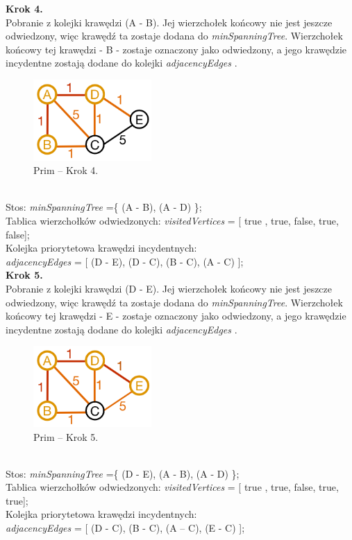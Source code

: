 \textbf{Krok 4.}\\
Pobranie z kolejki krawędzi (A - B). Jej wierzchołek końcowy nie jest jeszcze odwiedzony, więc krawędź ta zostaje dodana do \emph{minSpanningTree}. Wierzchołek końcowy tej krawędzi - B - zostaje oznaczony jako odwiedzony, a jego krawędzie incydentne zostają dodane do kolejki \emph{adjacencyEdges} .
\begin{figure}[htb!]
	\centering
	\includegraphics[width=0.4\textwidth]{tex/fig/graf4}
	\caption{Prim -- Krok 4.}
	\label{fig: g4}
\end{figure}\\
Stos: \emph{minSpanningTree} =\{ (A - B), (A - D) \};\\
Tablica wierzchołków odwiedzonych: \emph{visitedVertices} = [ true , true, false, true, false];\\
Kolejka priorytetowa krawędzi incydentnych: \\ \emph{adjacencyEdges} = [ (D - E), (D - C), (B - C), (A - C) ];\\

\textbf{Krok 5.}\\
Pobranie z kolejki krawędzi (D - E). Jej wierzchołek końcowy nie jest jeszcze odwiedzony, więc krawędź ta zostaje dodana do \emph{minSpanningTree}. Wierzchołek końcowy tej krawędzi - E - zostaje oznaczony jako odwiedzony, a jego krawędzie incydentne zostają dodane do kolejki \emph{adjacencyEdges} .
\begin{figure}[htb!]
	\centering
	\includegraphics[width=0.4\textwidth]{tex/fig/graf5}
	\caption{Prim -- Krok 5.}
	\label{fig: g5}
\end{figure}\\
Stos: \emph{minSpanningTree} =\{ (D - E), (A - B), (A - D) \};\\
Tablica wierzchołków odwiedzonych: \emph{visitedVertices} = [ true , true, false, true, true];\\
Kolejka priorytetowa krawędzi incydentnych: \\ \emph{adjacencyEdges} = [ (D - C), (B - C), (A -- C), (E - C) ];\\

